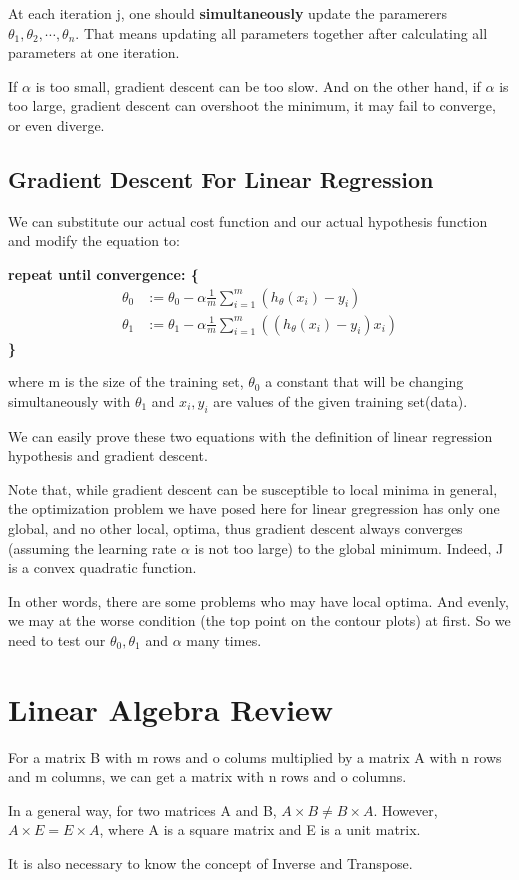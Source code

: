 \documentclass[11pt]{article}
\begin{document}
		At each iteration j, one should \textbf{simultaneously} update the paramerers $\theta _1, \theta _2, \cdots ,\theta _n$. That means updating all parameters together after calculating all parameters at one iteration.

		If $\alpha$ is too small, gradient descent
		can be too slow. And on the other hand, if $\alpha$ is too large, gradient descent can overshoot the minimum, it may fail to converge, or even diverge.

	\subsection{Gradient Descent For Linear Regression}

		We can substitute our actual cost function and our actual hypothesis function and modify the equation to:

		\textbf{repeat until convergence: \{	
			\begin{align}
				\theta _{0} &:= \theta _0 - \alpha \frac{1}{m}\sum_{i=1}^{m}(h_{\theta}(x_i)-y_i) \\
				\theta _{1} &:= \theta _1 - \alpha \frac{1}{m}\sum_{i=1}^{m}((h_{\theta}(x_i)-y_i)x_i)
			\end{align}
			\qquad \} }

		where m is the size of the training set, $\theta _0$ a constant that will be changing simultaneously with $\theta _1$ and $x_i, y_i$ are values of the given training set(data).

		We can easily prove these two equations with the definition of linear regression hypothesis and gradient descent.

		Note that, while gradient descent can be susceptible to local minima in general, the optimization problem we have posed here for linear gregression has only one global, and no other local,  optima, thus gradient descent always converges (assuming the learning rate $\alpha$ is not too large) to the global minimum. Indeed, J is a convex quadratic function. 

		In other words, there are some problems who may have local optima. And evenly, we may at the worse condition (the top point on the contour plots) at first. So we need to test our $\theta _0, \theta _1$ and $\alpha$ many times.

	\section{Linear Algebra Review}

		For a matrix B with m rows and o colums multiplied by a matrix A with n rows and m columns, we can get a matrix with n rows and o columns.

		In a general way, for two matrices A and B, $A\times B \neq B \times A$. However, $A \times E = E \times A$, where A is a square matrix and E is a unit matrix.

		It is also necessary to know the concept of Inverse and Transpose.
\end{document}
